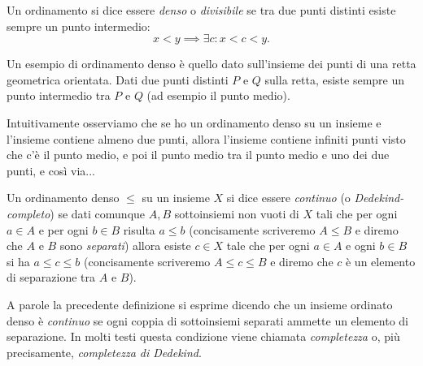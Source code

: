 \begin{definition}
  \label{def:ordinamento_denso}%
  Un ordinamento si dice essere
  \emph{denso}%
%
 o \emph{divisibile} 
  se tra due punti distinti esiste sempre un punto intermedio:
  \[
   x < y \implies \exists c \colon x < c < y.
  \]
\end{definition}

\begin{example}
Un esempio di ordinamento denso è quello dato sull'insieme dei punti 
di una retta geometrica orientata.
Dati due punti distinti $P$ e $Q$ sulla retta, 
esiste sempre un punto intermedio tra $P$ e $Q$ (ad esempio il punto medio).

Intuitivamente osserviamo che se ho un ordinamento denso su un insieme 
e l'insieme contiene almeno due punti, allora l'insieme 
contiene infiniti punti visto che c'è il punto medio, e poi il punto medio 
tra il punto medio e uno dei due punti, e così via...
\end{example}

\begin{definition}
  \label{def:ordinamento_continuo}%
  Un ordinamento denso $\le$ su un insieme $X$ si dice essere
  \emph{continuo}%
%
  (o \emph{Dedekind-completo})
  se dati comunque $A,B$ sottoinsiemi non vuoti di $X$
    tali che per ogni $a\in A$ e per ogni $b\in B$ risulta $a\le b$
    (concisamente scriveremo $A\le B$ e diremo che $A$ e $B$ sono 
    \emph{separati})
    allora esiste $c\in X$ tale che per ogni $a\in A$ e ogni $b\in B$ 
    si ha $a\le c \le b$ (concisamente scriveremo $A\le c \le B$
    e diremo che $c$ è un elemento di separazione tra $A$ e $B$).
\end{definition}

A parole la precedente definizione si esprime dicendo che un insieme ordinato
denso è \emph{continuo} se ogni coppia di sottoinsiemi separati 
ammette un elemento di separazione.
In molti testi questa condizione viene chiamata \emph{completezza}
o, più precisamente, \emph{completezza di Dedekind}.
%
%

